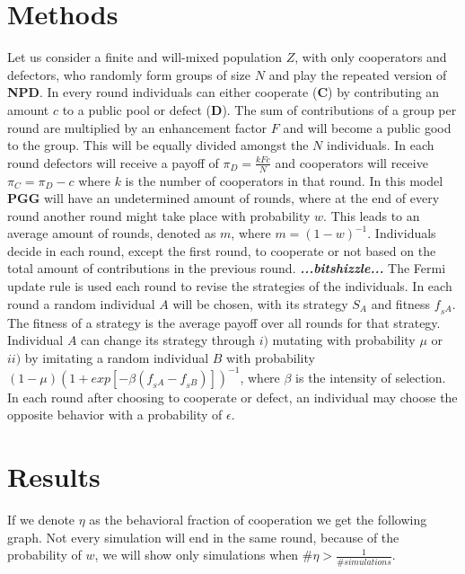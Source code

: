 \documentclass[letterpaper]{article}
\begin{document}
\section{Methods}
Let us consider a finite and will-mixed population $Z$, with only cooperators and defectors, who randomly form groups of size $N$ and play the repeated version of \textbf{NPD}. In every round individuals can either cooperate (\textbf{C}) by contributing an amount $c$ to a public pool or defect (\textbf{D}). The sum of contributions of a group per round are multiplied by an enhancement factor $F$ and will become a public good to the group. This will be equally divided amongst  the $N$ individuals. In each round defectors will receive a payoff of $\pi_{D}= \frac{kFc}{N}$  and cooperators will receive $\pi_{C}=\pi_{D}-c$ where $k$ is the number of cooperators in that round. In this model \textbf{PGG} will have an undetermined amount of rounds, where at the end of every round another round might take place with probability $w$. This leads to an average amount of rounds, denoted as $m$, where $m= (1-w)^{-1}$. Individuals decide in each round, except the first round, to cooperate or not based on the total amount of contributions in the previous round.
\textit{\textbf{...bitshizzle...}}
The Fermi update rule \citep{traulsen2006stochastic,grujic2014comparative} is used each round to revise the strategies of the individuals.
In each round a random individual $A$ will be chosen, with its strategy $S_{A}$ and fitness $f_{_S{A}}$. The fitness of a strategy is the average payoff over all rounds for that strategy. Individual $A$ can change its strategy through $i)$ mutating with probability $\mu$ or $ii)$ by imitating a random individual $B$ with probability $(1-\mu)(1+exp[-\beta(f_{_S{A}}-f_{_S{B}})])^{-1}$, where $\beta$ is the intensity of selection.
In each round after choosing to cooperate or defect, an individual may choose the opposite behavior with a probability of $\epsilon$.


\section{Results}
If we denote $\eta$ as the behavioral fraction of cooperation we get the following graph. Not every simulation will end in the same round, because of the probability of $w$, we will show only simulations when  $\# \eta > \frac{1}{\# simulations}$.
\end{document}
